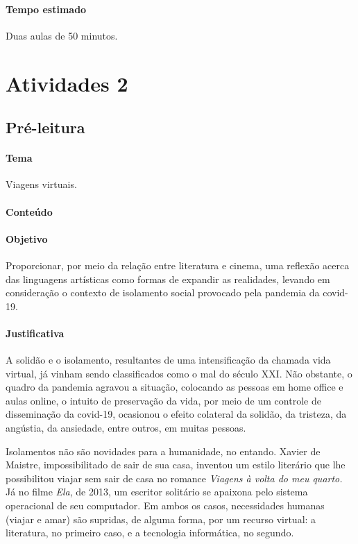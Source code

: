 \documentclass[12pt]{extarticle}
\begin{document}
\paragraph{Tempo estimado} Duas aulas de 50 minutos.

\section{Atividades 2}



\subsection{Pré-leitura}


\paragraph{Tema} Viagens virtuais.

\paragraph{Conteúdo} 

\paragraph{Objetivo} Proporcionar, por meio da relação entre literatura e cinema, 
uma reflexão acerca das linguagens artísticas como formas de expandir as realidades,
levando em consideração o contexto de isolamento social provocado pela pandemia da covid-19.

\paragraph{Justificativa} A solidão e o isolamento, resultantes de uma intensificação
da chamada vida virtual, já vinham sendo classificados como o mal do
século XXI. Não obstante, o quadro da pandemia agravou a situação,
colocando as pessoas em home office e aulas online, o intuito de
preservação da vida, por meio de um controle de disseminação da
covid-19, ocasionou o efeito colateral da solidão, da tristeza, da
angústia, da ansiedade, entre outros, em muitas pessoas.

Isolamentos não são novidades para a humanidade, no entando. Xavier de 
Maistre, impossibilitado de sair de sua casa, inventou um estilo
literário que lhe possibilitou viajar sem sair de casa no romance \emph{Viagens à volta do meu quarto.}
Já no filme \emph{Ela}, de 2013, um escritor solitário se apaixona pelo 
sistema operacional de seu computador.
Em ambos os casos, necessidades humanas (viajar e amar) são
supridas, de alguma forma, por um recurso virtual: a literatura, no primeiro caso,
e a tecnologia informática, no segundo. 
\end{document}

